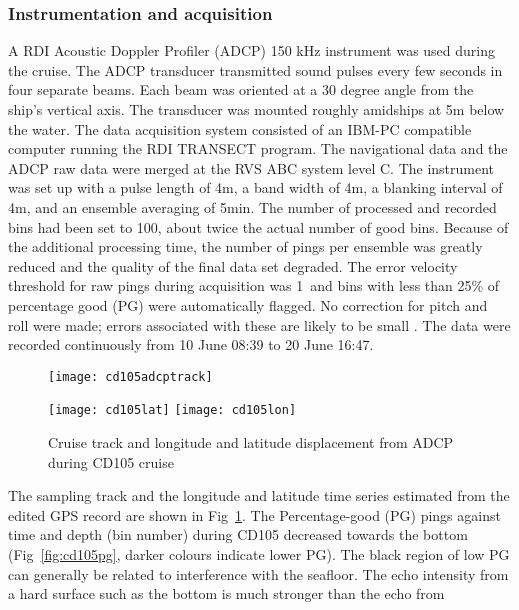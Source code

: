 \subsubsection{Instrumentation and acquisition}
A RDI Acoustic Doppler Profiler (ADCP) 150 kHz instrument was used
during the cruise.  The ADCP transducer transmitted sound pulses
every few seconds in four separate beams. Each beam was oriented
at a 30 degree angle from the ship's vertical axis. The transducer
was mounted roughly amidships at 5m below the water. The data
acquisition system consisted of an IBM-PC compatible computer
running the  RDI TRANSECT program. The navigational data and the
ADCP raw data were merged at the RVS ABC system level C. The
instrument was set up with a pulse length of 4m, a band width of
4m, a blanking interval of 4m, and an ensemble averaging of 5min.
The number of processed and recorded bins had been set to 100,
about twice the actual number of good bins. Because of the
additional processing time, the number of pings per ensemble was
greatly reduced and the quality of the final data set degraded.
The error velocity threshold for raw pings during acquisition was
1\vel\, and bins with less than 25\% of percentage good (PG) were
automatically flagged. No correction for pitch and roll were made;
errors associated with these are likely to be small
\citep{Kosro85}. The data were recorded continuously from 10 June
08:39 to 20 June 16:47.
\begin{figure}[tbh]
  \centering
  \begin{minipage}{7cm}
  \texttt{[image: cd105adcptrack]}
  \end{minipage}
  \begin{minipage}{7cm}
  \texttt{[image: cd105lat]}
  \texttt{[image: cd105lon]}
  \end{minipage}
  \caption{Cruise track and longitude and latitude displacement from ADCP during
   CD105 cruise}
  \label{fig:cd105track}
\end{figure}
The sampling track and the longitude and latitude time series
estimated from the edited GPS record are shown in
Fig~\ref{fig:cd105track}. The Percentage-good (PG) pings against
time and depth (bin number) during CD105 decreased towards the
bottom (Fig~\ref{fig:cd105pg}, darker colours indicate lower PG).
The black region of low PG can generally be related to
interference with the seafloor. The echo intensity from a hard
surface such as the bottom is much stronger than the echo from
